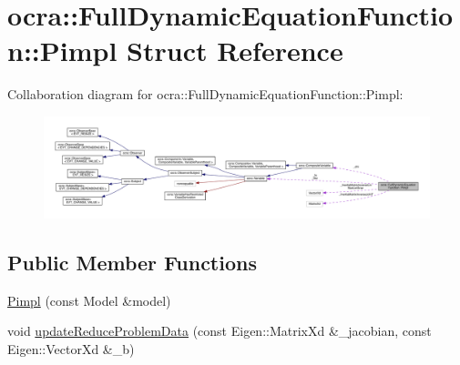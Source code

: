 \hypertarget{structFullDynamicEquationFunction_1_1Pimpl}{}\section{ocra\+:\+:Full\+Dynamic\+Equation\+Function\+:\+:Pimpl Struct Reference}
\label{structFullDynamicEquationFunction_1_1Pimpl}


Collaboration diagram for ocra\+:\+:Full\+Dynamic\+Equation\+Function\+:\+:Pimpl\+:\nopagebreak
\begin{figure}[H]
\begin{center}
\leavevmode
\includegraphics[width=350pt]{d6/d01/structFullDynamicEquationFunction_1_1Pimpl__coll__graph}
\end{center}
\end{figure}
\subsection*{Public Member Functions}
\begin{DoxyCompactItemize}
\item 
\hyperlink{structFullDynamicEquationFunction_1_1Pimpl_acc3b35606d52aa163f27d80f49cb3aaf}{Pimpl} (const Model \&model)
\item 
void \hyperlink{structFullDynamicEquationFunction_1_1Pimpl_a4d1df4cadec603942aeb750212a2d258}{update\+Reduce\+Problem\+Data} (const Eigen\+::\+Matrix\+Xd \&\+\_\+jacobian, const Eigen\+::\+Vector\+Xd \&\+\_\+b)
\end{DoxyCompactItemize}
